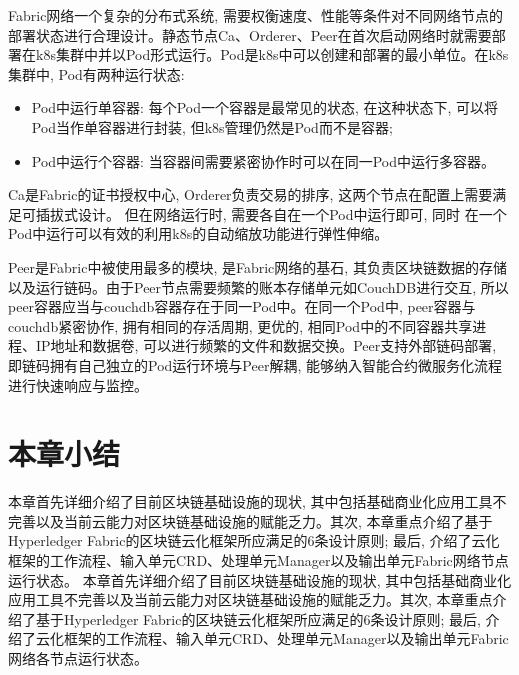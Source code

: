 Fabric网络一个复杂的分布式系统, 需要权衡速度、性能等条件对不同网络节点的部署状态进行合理设计。静态节点Ca、Orderer、Peer在首次启动网络时就需要部署在k8s集群中并以Pod形式运行。Pod是k8s中可以创建和部署的最小单位。在k8s集群中, Pod有两种运行状态:

\begin{itemize}[itemindent=2em]
    \item Pod中运行单容器: 每个Pod一个容器是最常见的状态, 在这种状态下, 可以将Pod当作单容器进行封装, 但k8s管理仍然是Pod而不是容器;

    \item Pod中运行个容器: 当容器间需要紧密协作时可以在同一Pod中运行多容器。
\end{itemize}

Ca是Fabric的证书授权中心, Orderer负责交易的排序, 这两个节点在配置上需要满足可插拔式设计。 但在网络运行时, 需要各自在一个Pod中运行即可, 同时 在一个Pod中运行可以有效的利用k8s的自动缩放功能进行弹性伸缩。

Peer是Fabric中被使用最多的模块, 是Fabric网络的基石, 其负责区块链数据的存储以及运行链码。由于Peer节点需要频繁的账本存储单元如CouchDB进行交互, 所以peer容器应当与couchdb容器存在于同一Pod中。在同一个Pod中, peer容器与couchdb紧密协作, 拥有相同的存活周期, 更优的, 相同Pod中的不同容器共享进程、IP地址和数据卷, 可以进行频繁的文件和数据交换。Peer支持外部链码部署, 即链码拥有自己独立的Pod运行环境与Peer解耦, 能够纳入智能合约微服务化流程\cite{zhangfuli2021smartcontract}进行快速响应与监控。 

\section{本章小结}

本章首先详细介绍了目前区块链基础设施的现状, 其中包括基础商业化应用工具不完善以及当前云能力对区块链基础设施的赋能乏力。其次, 本章重点介绍了基于Hyperledger Fabric的区块链云化框架所应满足的6条设计原则; 最后, 介绍了云化框架的工作流程、输入单元CRD、处理单元Manager以及输出单元Fabric网络节点运行状态。
本章首先详细介绍了目前区块链基础设施的现状, 其中包括基础商业化应用工具不完善以及当前云能力对区块链基础设施的赋能乏力。其次, 本章重点介绍了基于Hyperledger Fabric的区块链云化框架所应满足的6条设计原则; 最后, 介绍了云化框架的工作流程、输入单元CRD、处理单元Manager以及输出单元Fabric网络各节点运行状态。